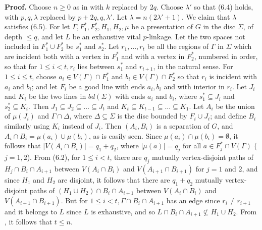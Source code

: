 \textbf{Proof.} Choose $n \ge 0$ as in  with $k$ replaced by $2q$. Choose $\lambda'$ so that (6.4) holds, with $p, q, \lambda$ replaced by $p+2q, q, \lambda'$. Let $\lambda = n(2\lambda'+1)$. We claim that $\lambda$ satisfies (6.5). For let $\Gamma, F_1^*, F_2^*, H_1, H_2, \mu$ be a presentation of $G$ in the disc $\Sigma$, of depth $\le q$, and let $L$ be an exhaustive vital $p$-linkage. Let the two spaces not included in $F_1^* \cup F_2^*$ be $s_1^*$ and $s_2^*$. Let $r_1, \ldots, r_t$ be all the regions of $\Gamma$ in $\Sigma$ which are incident both with a vertex in $F_1^*$ and with a vertex in $F_2^*$, numbered in order, so that for $1 \le i < t, r_i$ lies between $s_1^*$ and $r_{i+1}$, in the natural sense. For $1 \le i \le t$, choose $a_i \in V(\Gamma) \cap F_1^*$ and $b_i \in V(\Gamma) \cap F_2^*$ so that $r_i$ is incident with $a_i$ and $b_i$; and let $F_i$ be a good line with ends $a_i, b_i$ and with interior in $r_i$. Let $J_i$ and $K_i$ be the two lines in $bd(\Sigma)$ with ends $a_i$ and $b_i$, where $s_1^* \subseteq J_i$ and $s_2^* \subseteq K_i$. Then $J_1 \subseteq J_2 \subseteq \ldots \subseteq J_t$ and $K_t \subseteq K_{t-1} \subseteq \ldots \subseteq K_1$. Let $A_i$ be the union of $\mu(J_i)$ and $\Gamma \cap \Delta$, where $\Delta \subseteq \Sigma$ is the disc bounded by $F_i \cup J_i$; and define $B_i$ similarly using $K_i$ instead of $J_i$. Then $(A_i, B_i)$ is a separation of $G$, and $A_i \cap B_i = \mu(a_i) \cup \mu(b_i)$, as is easily seen. Since $\mu(a_i) \cap \mu(b_i) = \emptyset$, it follows that $|V(A_i \cap B_i)| = q_1 + q_2$, where $|\mu(a)| = q_j$ for all $a \in F_j^* \cap V(\Gamma)$ ($j = 1, 2$). From (6.2), for $1 \le i < t$, there are $q_j$ mutually vertex-disjoint paths of $H_j \cap B_i \cap A_{i+1}$ between $V(A_i \cap B_i)$ and $V(A_{i+1} \cap B_{i+1})$ for $j = 1$ and $2$, and since $H_1$ and $H_2$ are disjoint, it follows that there are $q_1 + q_2$ mutually vertex-disjoint paths of $(H_1 \cup H_2) \cap B_i \cap A_{i+1}$ between $V(A_i \cap B_i)$ and $V(A_{i+1} \cap B_{i+1})$. But for $1 \le i < t, \Gamma \cap B_i \cap A_{i+1}$ has an edge since $r_i \ne r_{i+1}$ and it belongs to $L$ since $L$ is exhaustive, and so $L \cap B_i \cap A_{i+1} \not\subseteq H_1 \cup H_2$. From , it follows that $t \le n$.

